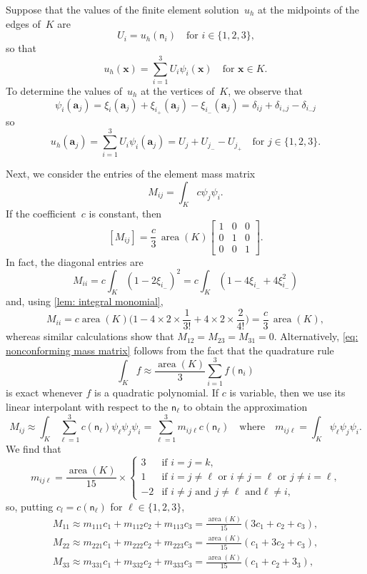 \documentclass[a4paper,12pt]{article}
\newcommand{\bs}[1]{\boldsymbol{#1}}
\newcommand{\area}{\operatorname{area}}
\begin{document}
Suppose that the values of the finite element solution~$u_h$ at the midpoints
of the edges of~$K$ are
\[
U_i=u_h(\mathsf{n}_i)\quad\text{for $i\in\{1,2,3\}$,}
\]
so that
\[
u_h(\bs{x})=\sum_{i=1}^3U_i\psi_i(\bs{x})\quad\text{for $\bs{x}\in K$.}
\]
To determine the values of~$u_h$ at the vertices of~$K$, we observe that
\[
\psi_i(\bs{a}_j)=\xi_i(\bs{a}_j)+\xi_{i_+}(\bs{a}_j)-\xi_{i_-}(\bs{a}_j)
    =\delta_{ij}+\delta_{i_+j}-\delta_{i_-j}
\]
so
\[
u_h(\bs{a}_j)=\sum_{i=1}^3U_i\psi_i(\bs{a}_j)
    =U_j+U_{j_-}-U_{j_+}\quad\text{for $j\in\{1,2,3\}$.}
\]

Next, we consider the entries of the element mass matrix
\[
M_{ij}=\int_Kc\psi_j\psi_i.
\]
If the coefficient~$c$ is constant, then
\begin{equation}\label{eq: nonconforming mass matrix}
[M_{ij}]=\frac{c}{3}\,\area(K)
    \begin{bmatrix}1&0&0\\ 0&1&0\\ 0&0&1\end{bmatrix}.
\end{equation}
In fact, the diagonal entries are
\[
M_{ii}=c\int_K(1-2\xi_{i_-})^2
    =c\int_K(1-4\xi_{i_-}+4\xi_{i_-}^2)
\]
and, using \cref{lem: integral monomial},
\[
M_{ii}=c\area(K)\biggl(1-4\times2\times\frac{1}{3!}
    +4\times2\times\frac{2}{4!}\biggr)
    =\frac{c}{3}\,\area(K),
\]
whereas similar calculations show that $M_{12}=M_{23}=M_{31}=0$.  Alternatively,
\eqref{eq: nonconforming mass matrix} follows from the fact that the quadrature
rule
\begin{equation}\label{eq: edge midpt rule}
\int_K f\approx\frac{\area(K)}{3}\sum_{i=1}^3f(\mathsf{n}_i)
\end{equation}
is exact whenever $f$ is a quadratic polynomial.  If $c$ is variable, then
we use its linear interpolant with respect to the $\mathsf{n}_\ell$ to obtain
the approximation
\[
M_{ij}\approx\int_K\sum_{\ell=1}^3c(\mathsf{n}_\ell)\psi_\ell\psi_j\psi_i
    =\sum_{\ell=1}^3 m_{ij\ell}c(\mathsf{n}_\ell)
\quad\text{where}\quad m_{ij\ell}=\int_K\psi_\ell\psi_j\psi_i.
\]
We find that
\[
m_{ij\ell}=\frac{\area(K)}{15}\times\begin{cases}
    3&\text{if $i=j=k$,}\\
    1&\text{if $i=j\ne\ell$ or $i\ne j=\ell$ or $j\ne i=\ell$,}\\
    -2&\text{if $i\ne j$ and $j\ne\ell$ and$\ell\ne i$,}
\end{cases}
\]
so, putting $c_l=c(\mathsf{n}_\ell)$ for $\ell\in\{1,2,3\}$,
\begin{align*}
M_{11}\approx m_{111}c_1+m_{112}c_2+m_{113}c_3=\frac{\area(K)}{15}
(3c_1+c_2+c_3),\\
M_{22}\approx m_{221}c_1+m_{222}c_2+m_{223}c_3=\frac{\area(K)}{15}
(c_1+3c_2+c_3),\\
M_{33}\approx m_{331}c_1+m_{332}c_2+m_{333}c_3=\frac{\area(K)}{15}
(c_1+c_2+3_3),\\
\end{align*}
\end{document}
